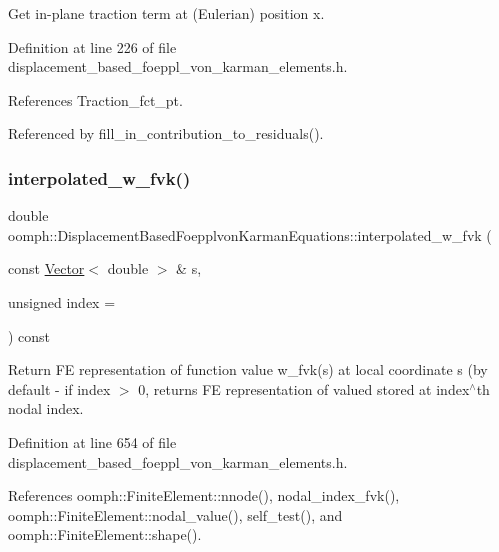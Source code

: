 Get in-\/plane traction term at (Eulerian) position x. 



Definition at line 226 of file displacement\+\_\+based\+\_\+foeppl\+\_\+von\+\_\+karman\+\_\+elements.\+h.



References Traction\+\_\+fct\+\_\+pt.



Referenced by fill\+\_\+in\+\_\+contribution\+\_\+to\+\_\+residuals().

\mbox{\label{classoomph_1_1DisplacementBasedFoepplvonKarmanEquations_aac329f225fd5f309b23da3299fefdec1}} 
\subsubsection{\texorpdfstring{interpolated\+\_\+w\+\_\+fvk()}{interpolated\_w\_fvk()}}
{\footnotesize\ttfamily double oomph\+::\+Displacement\+Based\+Foepplvon\+Karman\+Equations\+::interpolated\+\_\+w\+\_\+fvk (\begin{DoxyParamCaption}\item[{const \hyperlink{classoomph_1_1Vector}{Vector}$<$ double $>$ \&}]{s,  }\item[{unsigned}]{index = {} }\end{DoxyParamCaption}) const\hspace{0.3cm}{\ttfamily [inline]}}



Return FE representation of function value w\+\_\+fvk(s) at local coordinate s (by default -\/ if index $>$ 0, returns FE representation of valued stored at index$^\wedge$th nodal index. 



Definition at line 654 of file displacement\+\_\+based\+\_\+foeppl\+\_\+von\+\_\+karman\+\_\+elements.\+h.



References oomph\+::\+Finite\+Element\+::nnode(), nodal\+\_\+index\+\_\+fvk(), oomph\+::\+Finite\+Element\+::nodal\+\_\+value(), self\+\_\+test(), and oomph\+::\+Finite\+Element\+::shape().



